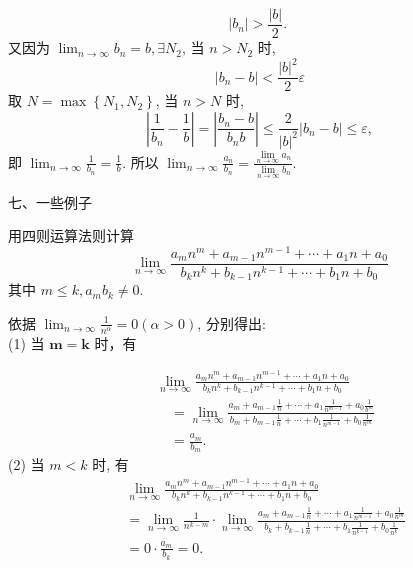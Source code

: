 \documentclass [t,12pt,mathserif] {beamer}
\begin{document}
\begin{frame}{}%
 $$
\left|b_n\right|>\frac{|b|}{2} \text {. }
$$
又因为 $\lim _{n \rightarrow \infty} b_n=b, \exists N_2$, 当 $n>N_2$ 时,
$$
\left|b_n-b\right|<\frac{|b|^2}{2} \varepsilon
$$
取 $N=\max \left\{N_1, N_2\right\}$, 当 $n>N$ 时,
$$
\left|\frac{1}{b_n}-\frac{1}{b}\right|=\left|\frac{b_n-b}{b_n b}\right| \leq \frac{2}{|b|^2}\left|b_n-b\right| \leq \varepsilon,
$$
即 $\lim _{n \rightarrow \infty} \frac{1}{b_n}=\frac{1}{b}$. 所以 $\lim _{n \rightarrow \infty} \frac{a_n}{b_n}=\frac{\lim \limits_{n \rightarrow \infty} a_n}{\lim \limits_{n \rightarrow \infty} b_n}$.   
\end{frame}


\begin{frame}{ 七、一些例子}%
\begin{ex}
用四则运算法则计算
$$
\lim _{n \rightarrow \infty} \frac{a_m n^m+a_{m-1} n^{m-1}+\cdots+a_1 n+a_0}{b_k n^k+b_{k-1} n^{k-1}+\cdots+b_1 n+b_0}
$$
其中 $m \leq k, a_m b_k \neq 0$.
\end{ex}
\jie 依据 $\lim _{n \rightarrow \infty} \frac{1}{n^\alpha}=0(\alpha>0)$, 分别得出:\\
(1) 当 $\boldsymbol{m}=\boldsymbol{k}$ 时，有  

\end{frame}


\begin{frame}{}%
\baselineskip
 $$
\begin{aligned}
& \lim _{n \rightarrow \infty} \frac{a_m n^m+a_{m-1} n^{m-1}+\cdots+a_1 n+a_0}{b_k n^k+b_{k-1} n^{k-1}+\cdots+b_1 n+b_0} \\
& \quad=\lim _{n \rightarrow \infty} \frac{a_m+a_{m-1} \frac{1}{n}+\cdots+a_1 \frac{1}{n^{m-1}}+a_0 \frac{1}{b^m}}{b_m+b_{m-1} \frac{1}{n}+\cdots+b_1 \frac{1}{n^{m-1}}+b_0 \frac{1}{n^m}} \\
& \quad=\frac{a_m}{b_m} .
\end{aligned}
$$
(2) 当 $m<k$ 时, 有  
$$
\begin{aligned}
& \lim _{n \rightarrow \infty} \frac{a_m n^m+a_{m-1} n^{m-1}+\cdots+a_1 n+a_0}{b_k n^k+b_{k-1} n^{k-1}+\cdots+b_1 n+b_0} \\
& =\lim _{n \rightarrow \infty} \frac{1}{n^{k-m}} \cdot \lim _{n \rightarrow \infty} \frac{a_m+a_{m-1} \frac{1}{n}+\cdots+a_1 \frac{1}{n^{m-1}}+a_0 \frac{1}{n^m}}{b_k+b_{k-1} \frac{1}{n}+\cdots+b_1 \frac{1}{n^{k-1}}+b_0 \frac{1}{n^k}} \\
& =0 \cdot \frac{a_m}{b_k}=0 .
\end{aligned}
$$

\end{frame}
\end{document}
